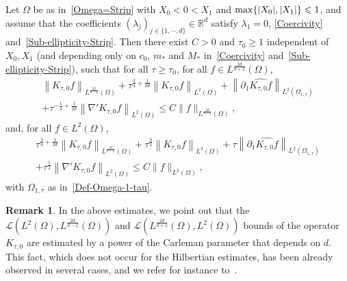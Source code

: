 \documentclass[10pt]{amsart}
\theoremstyle{definition}\newtheorem{defi}[theo]{Definition}\newtheorem{rema}[theo]{Remark}\newtheorem{exam}[theo]{Example}\newtheorem{exem}[theo]{Example}\newtheorem{nota}[theo]{Notation}
\newcommand{\scL}{\mathscr{L}}
\newcommand*\R{\mathbb{R}}
\renewcommand{\leq}{\leqslant}
\renewcommand{\geq}{\geqslant}
\begin{document}
\begin{prop}\label{Prop-OpNorm-Est-K0}
Let $\Omega$ be as in~\eqref{Omega=Strip} with $X_0 \! <\! 0\! <\! X_1$ and $\max\{|X_0|, |X_1|\}\linebreak \leq 1$, and assume that the coefficients $(\lambda_j)_{j \in \{1,\cdots,d\}} \in \R^d$ satisfy $\lambda_1 = 0$, \eqref{Coercivity} and~\eqref{Sub-ellipticity-Strip}. Then there exist $C>0$ and $\tau_0 \geq 1$ independent of $X_0, X_1$ (and depending only on $c_0$, $m_*$ and $M_*$ in~\eqref{Coercivity} and~\eqref{Sub-ellipticity-Strip}), such that for all $\tau \geq \tau_0$, for all $f \in L^{\frac{2d}{d+2}}(\Omega)$,
\begin{multline}\label{Est-K-tau-0-f-L-2_*}
\left\| K_{\tau,0} f\right\|_{L^{\frac{2d}{d-2}}(\Omega)} +
\tau^{\frac{3}{4}+\frac{1}{2d}}\left \| K_{\tau,0} f\right\|_{L^{2}(\Omega)} +
\left\| \partial_1 \widehat{ K_{\tau,0} f}\right\|_{L^2(\Omega_{1, \tau})}\\
+
\tau^{-\frac{1}{4} +\frac{1}{2d}} \left\| \nabla' K_{\tau,0} f\right\|_{L^2(\Omega)}
\leq C \| f \|_{L^{\frac{2d}{d+2}}(\Omega)},
\end{multline}
and, for all $f \in L^2(\Omega)$,
\begin{multline}\label{Est-K-tau-0-f-L-2}
\tau^{\frac{3}{4}+\frac{1}{2d}} \left\| K_{\tau,0} f\right\|_{L^{\frac{2d}{d-2}}(\Omega)} +
\tau^{\frac{3}{2}} \left\| K_{\tau,0} f\right\|_{L^{2}(\Omega)} +
\tau
\left\| \partial_1 \widehat{ K_{\tau,0} f}\right\|_{L^2(\Omega_{1, \tau})} \\
+
\tau^{\frac{1}{2}} \left\| \nabla' K_{\tau,0} f\right\|_{L^2(\Omega)}
\leq C \| f \|_{L^2(\Omega)},
\end{multline}
with $\Omega_{1, \tau}$ as in~\eqref{Def-Omega-1-tau}.
\end{prop}
\begin{rema}
In the above estimates, we point out that the $\scL(L^2(\Omega),L^{\frac{2d}{d-2}}(\Omega))$ and $\scL(L^{\frac{2d}{d+2}}(\Omega),L^2(\Omega))$ bounds of the operator $K_{\tau,0}$ are estimated by a power of the Carleman parameter that depends on $d$. This fact, which does not occur for the Hilbertian estimates, has been already observed in several cases, and we refer for instance to~\cite{barcelo1988weighted, koch2001carleman, koch2005dispersive, Sogge1989uniquecontinuation}.
\end{rema}
\end{document}
